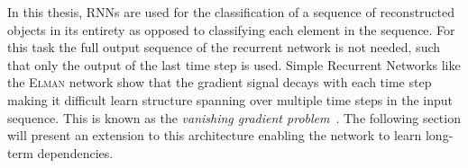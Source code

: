 In this thesis, RNNs are used for the classification of a sequence of
reconstructed objects in its entirety as opposed to classifying each element in
the sequence. For this task the full output sequence of the recurrent network is
not needed, such that only the output of the last time step is used. Simple
Recurrent Networks like the \textsc{Elman} network show that the gradient signal
decays with each time step making it difficult learn structure spanning over
multiple time steps in the input sequence. This is known as the \emph{vanishing
  gradient problem}~\cite{hochreiter, lecun_bengio_hinton_DL}. The following
section will present an extension to this architecture enabling the network to
learn long-term dependencies.

